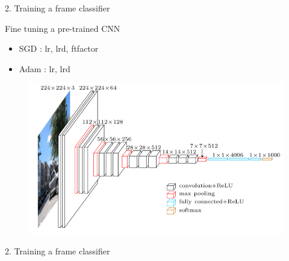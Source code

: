 \begin{frame}{2. Training a frame classifier}

	\begin{block}{\small Fine tuning a pre-trained CNN}
	\begin{itemize}
		\item SGD : lr, lrd, ftfactor
		\item Adam : lr, lrd
	\end{itemize}
	\end{block}
	
	\begin{figure}[h]
		\centering
		\includegraphics[width=.79\linewidth]{images/vgg16.png}
	\end{figure}

\end{frame}


\begin{frame}{2. Training a frame classifier}

	\begin{table}[h]
		\centering
			\caption{\small Forward+Backward with batches of 30 images.} 
			\label{table:cnnbenchmark}
		\end{table}

\end{frame}


